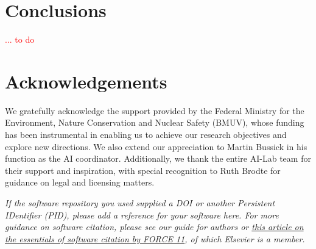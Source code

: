 \documentclass[preprint,12pt, a4paper]{elsarticle}
\begin{document}
\section{Conclusions}
\textcolor{red}{... to do}

\section*{Acknowledgements}
\label{}
We gratefully acknowledge the support provided by the Federal Ministry for the Environment, Nature Conservation and Nuclear Safety (BMUV), whose funding has been instrumental in enabling us to achieve our research objectives and explore new directions. 
We also extend our appreciation to Martin Bussick in his function as the AI coordinator. 
Additionally, we thank the entire AI-Lab team for their support and inspiration, with special recognition to Ruth Brodte for guidance on legal and licensing matters.

 


\textit{If the software repository you used supplied a DOI or another
Persistent IDentifier (PID), please add a reference for your software
here. For more guidance on software citation, please see our guide for
authors or \href{https://f1000research.com/articles/9-1257/v2}{this
  article on the essentials of software citation by FORCE 11}, of
which Elsevier is a member.}
\end{document}
